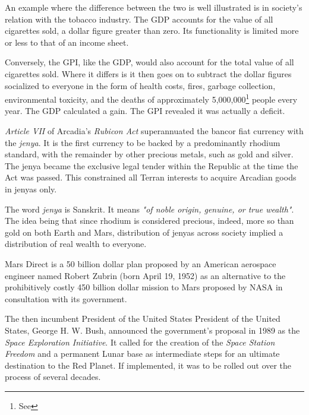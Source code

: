 An example where the difference between the two is well illustrated is in society's relation with the tobacco industry. The GDP accounts for the value of all cigarettes sold, a dollar figure greater than zero. Its functionality is limited more or less to that of an income sheet.

Conversely, the GPI, like the GDP, would also account for the total value of all cigarettes sold. Where it differs is it then goes on to subtract the dollar figures socialized to everyone in the form of health costs, fires, garbage collection, environmental toxicity, and the deaths of approximately 5,000,000\footnote[]{See } people every year. The GDP calculated a gain. The GPI revealed it was actually a deficit.

{\it Article VII} of Arcadia's {\it Rubicon Act} superannuated the bancor fiat currency with the {\it jenya}. It is the first currency to be backed by a predominantly rhodium standard, with the remainder by other precious metals, such as gold and silver. The jenya became the exclusive legal tender within the Republic at the time the Act was passed. This constrained all Terran interests to acquire Arcadian goods in jenyas only.

The word {\it jenya} is Sanskrit. It means {\it "of noble origin, genuine, or true wealth"}. The idea being that since rhodium is considered precious, indeed, more so than gold on both Earth and Mars, distribution of jenyas across society implied a distribution of real wealth to everyone.

Mars Direct is a \type{$}50 billion dollar plan proposed by an American aerospace engineer named Robert Zubrin (born April 19, 1952) as an alternative to the prohibitively costly \type{$}450 billion dollar mission to Mars proposed by NASA in consultation with its government.

The then incumbent President of the United States President of the United States, George H. W. Bush, announced the government's proposal in 1989 as the {\it Space Exploration Initiative}. It called for the creation of the {\it Space Station Freedom} and a permanent Lunar base as intermediate steps for an ultimate destination to the Red Planet. If implemented, it was to be rolled out over the process of several decades.


